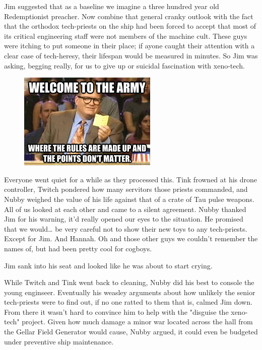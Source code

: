 Jim suggested that as a baseline we imagine a three hundred year old Redemptionist preacher. 
Now combine that general cranky outlook with the fact that the orthodox tech-priests on the ship had been forced to accept that most of its critical engineering staff were not members of the machine cult. 
These guys were itching to put someone in their place; 
if ayone caught their attention with a clear case of tech-heresy, their lifespan would be measured in minutes. 
So Jim was asking, begging really, for us to give up or suicidal fascination with xeno-tech.

\begin{figure}
	\begin{center}
		\includegraphics[width=\figwidth]{pics/11/6.png}
	\end{center}
\end{figure}
Everyone went quiet for a while as they processed this. 
Tink frowned at his drone controller, Twitch pondered how many servitors those priests commanded, and Nubby weighed the value of his life against that of a crate of Tau pulse weapons. 
All of us looked at each other and came to a silent agreement. 
Nubby thanked Jim for his warning, it'd really opened our eyes to the situation. 
He promised that we would… be very careful not to show their new toys to any tech-priests. 
Except for Jim. 
And Hannah. 
Oh and those other guys we couldn't remember the names of, but had been pretty cool for cogboys. 


Jim sank into his seat and looked like he was about to start crying. 


While Twitch and Tink went back to cleaning, Nubby did his best to console the young enginseer. 
Eventually his weasley arguments about how unlikely the senior tech-priests were to find out, if no one ratted to them that is, calmed Jim down. 
From there it wasn't hard to convince him to help with the "disguise the xeno-tech" project. 
Given how much damage a minor war located across the hall from the Gellar Field Generator would cause, Nubby argued, it could even be budgeted under preventive ship maintenance. 


